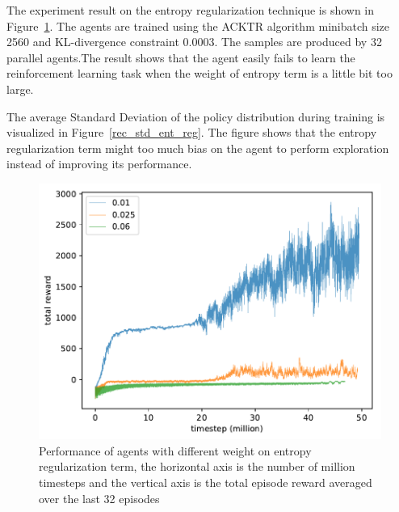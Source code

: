 The experiment result on the entropy regularization technique is shown in Figure~\ref{rec_ent_reg}. The agents are trained using the ACKTR algorithm minibatch size 2560 and KL-divergence constraint 0.0003. The samples are produced by 32 parallel agents.The result shows that the agent easily fails to learn the reinforcement learning task when the weight of entropy term is a little bit too large. 

The average Standard Deviation of the policy distribution during training is visualized in Figure~\ref{rec_std_ent_reg}. The figure shows that the entropy regularization term might too much bias on the agent to perform exploration instead of improving its performance.
\begin{figure}[!htbp]
	\includegraphics[width=\textwidth]{images/rec_180609_ent_reg.pdf}
	\centering
	\caption{Performance of agents with different weight on entropy regularization term, the horizontal axis is the number of million timesteps and the vertical axis is the total episode reward averaged over the last 32 episodes}\label{rec_ent_reg}
\end{figure}

